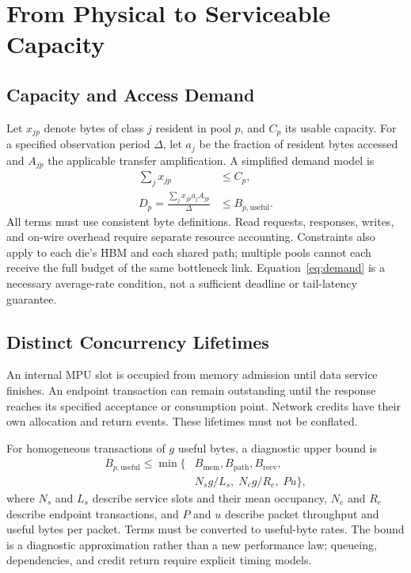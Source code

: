 \section{From Physical to Serviceable Capacity}
\subsection{Capacity and Access Demand}
Let $x_{jp}$ denote bytes of class $j$ resident in pool $p$, and $C_p$
its usable capacity. For a specified observation period $\Delta$, let
$a_j$ be the fraction of resident bytes accessed and $A_{jp}$ the
applicable transfer amplification. A simplified demand model is
\begin{align}
  \sum_j x_{jp} &\le C_p, \\
  D_p = \frac{\sum_j x_{jp}a_jA_{jp}}{\Delta}
       &\le B_{p,\mathrm{useful}}.
  \label{eq:demand}
\end{align}
All terms must use consistent byte definitions. Read requests, responses,
writes, and on-wire overhead require separate resource accounting.
Constraints also apply to each die's HBM and each shared path; multiple
pools cannot each receive the full budget of the same bottleneck link.
Equation~\ref{eq:demand} is a necessary average-rate condition, not a
sufficient deadline or tail-latency guarantee.

\subsection{Distinct Concurrency Lifetimes}
An internal MPU slot is occupied from memory admission until data service
finishes. An endpoint transaction can remain outstanding until the
response reaches its specified acceptance or consumption point. Network
credits have their own allocation and return events. These lifetimes
must not be conflated.

For homogeneous transactions of $g$ useful bytes, a diagnostic upper
bound is
\begin{equation}
\begin{split}
 B_{p,\mathrm{useful}} \le \min\{&B_{\mathrm{mem}}, B_{\mathrm{path}},
 B_{\mathrm{recv}},\\
 &N_s g/L_s,\; N_e g/R_e,\; P u\},
\end{split}
\label{eq:bound}
\end{equation}
where $N_s$ and $L_s$ describe service slots and their mean occupancy,
$N_e$ and $R_e$ describe endpoint transactions, and $P$ and $u$ describe
packet throughput and useful bytes per packet. Terms must be converted
to useful-byte rates. The bound is a diagnostic approximation rather
than a new performance law; queueing, dependencies, and credit return
require explicit timing models.

